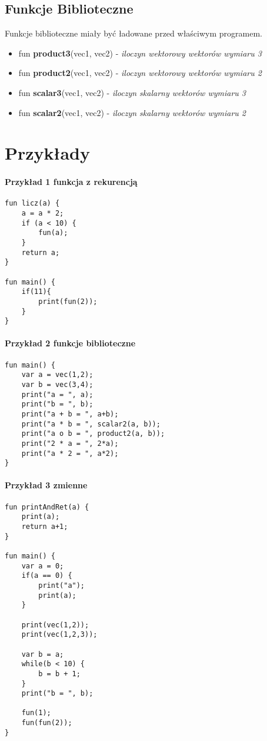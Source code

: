 \documentclass[11pt]{article} %
\begin{document}
\subsection{Funkcje Biblioteczne}
Funkcje biblioteczne miały być ładowane przed właściwym programem.
\begin{itemize}
	\item fun \textbf{product3}(vec1, vec2) - \textit{iloczyn wektorowy wektorów wymiaru 3}
	\item fun \textbf{product2}(vec1, vec2) - \textit{iloczyn wektorowy wektorów wymiaru 2}
	\item fun \textbf{scalar3}(vec1, vec2) - \textit{iloczyn skalarny wektorów wymiaru 3}
	\item fun \textbf{scalar2}(vec1, vec2) - \textit{iloczyn skalarny wektorów wymiaru 2}
\end{itemize}

\section{Przykłady}

\paragraph{Przykład 1 funkcja z rekurencją}
\begin{verbatim}
fun licz(a) {
    a = a * 2;
    if (a < 10) {
        fun(a);
    }
    return a;
}  				

fun main() {
    if(11){
        print(fun(2));
    }
}					
\end{verbatim}

\paragraph{Przykład 2 funkcje biblioteczne}
\begin{verbatim}
fun main() {
    var a = vec(1,2);
    var b = vec(3,4);
    print("a = ", a);
    print("b = ", b);
    print("a + b = ", a+b);
    print("a * b = ", scalar2(a, b));
    print("a o b = ", product2(a, b));
    print("2 * a = ", 2*a);
    print("a * 2 = ", a*2);
}   
\end{verbatim}

\paragraph{Przykład 3 zmienne}
\begin{verbatim}
fun printAndRet(a) {
    print(a);
    return a+1;
}

fun main() {
    var a = 0;
    if(a == 0) {
        print("a");
        print(a);
    }

    print(vec(1,2));
    print(vec(1,2,3));

    var b = a;
    while(b < 10) {
        b = b + 1;
    }
    print("b = ", b);

    fun(1);
    fun(fun(2));
}   
\end{verbatim}
\end{document}
